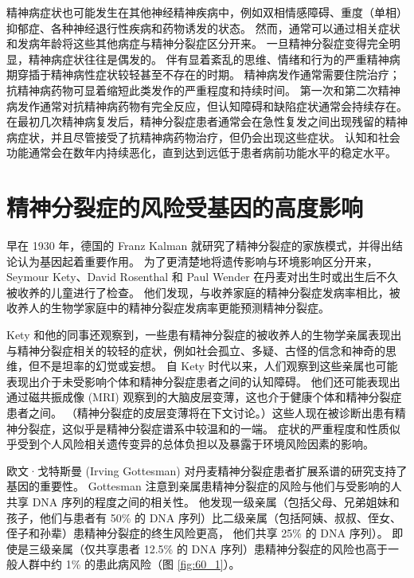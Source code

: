 精神病症状也可能发生在其他神经精神疾病中，例如双相情感障碍、重度（单相）抑郁症、各种神经退行性疾病和药物诱发的状态。 然而，通常可以通过相关症状和发病年龄将这些其他病症与精神分裂症区分开来。 一旦精神分裂症变得完全明显，精神病症状往往是偶发的。 伴有显着紊乱的思维、情绪和行为的严重精神病期穿插于精神病性症状较轻甚至不存在的时期。 精神病发作通常需要住院治疗； 抗精神病药物可显着缩短此类发作的严重程度和持续时间。 第一次和第二次精神病发作通常对抗精神病药物有完全反应，但认知障碍和缺陷症状通常会持续存在。 在最初几次精神病复发后，精神分裂症患者通常会在急性复发之间出现残留的精神病症状，并且尽管接受了抗精神病药物治疗，但仍会出现这些症状。 认知和社会功能通常会在数年内持续恶化，直到达到远低于患者病前功能水平的稳定水平。


\section{精神分裂症的风险受基因的高度影响}
早在 1930 年，德国的 Franz Kalman 就研究了精神分裂症的家族模式，并得出结论认为基因起着重要作用。 为了更清楚地将遗传影响与环境影响区分开来，Seymour Kety、David Rosenthal 和 Paul Wender 在丹麦对出生时或出生后不久被收养的儿童进行了检查。 他们发现，与收养家庭的精神分裂症发病率相比，被收养人的生物学家庭中的精神分裂症发病率更能预测精神分裂症。

Kety 和他的同事还观察到，一些患有精神分裂症的被收养人的生物学亲属表现出与精神分裂症相关的较轻的症状，例如社会孤立、多疑、古怪的信念和神奇的思维，但不是坦率的幻觉或妄想。 自 Kety 时代以来，人们观察到这些亲属也可能表现出介于未受影响个体和精神分裂症患者之间的认知障碍。 他们还可能表现出通过磁共振成像 (MRI) 观察到的大脑皮层变薄，这也介于健康个体和精神分裂症患者之间。 （精神分裂症的皮层变薄将在下文讨论。）这些人现在被诊断出患有精神分裂症，这似乎是精神分裂症谱系中较温和的一端。 症状的严重程度和性质似乎受到个人风险相关遗传变异的总体负担以及暴露于环境风险因素的影响。

欧文·戈特斯曼 (Irving Gottesman) 对丹麦精神分裂症患者扩展系谱的研究支持了基因的重要性。 Gottesman 注意到亲属患精神分裂症的风险与他们与受影响的人共享 DNA 序列的程度之间的相关性。 他发现一级亲属（包括父母、兄弟姐妹和孩子，他们与患者有 50\% 的 DNA 序列）比二级亲属（包括阿姨、叔叔、侄女、侄子和孙辈）患精神分裂症的终生风险更高， 他们共享 25\% 的 DNA 序列）。 即使是三级亲属（仅共享患者 12.5\% 的 DNA 序列）患精神分裂症的风险也高于一般人群中约 1\% 的患此病风险（图 \ref{fig:60_1}）。

